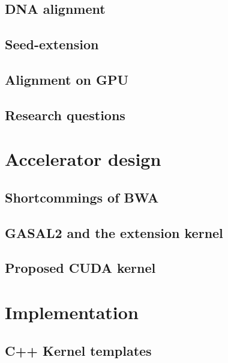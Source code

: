\documentclass[11pt,twoside]{ce}
\begin{document}
		\section{DNA alignment}
		
		
		\section{Seed-extension}
		
		
		\section{Alignment on GPU}
		
		
		\section{Research questions}
		
		
	\chapter{Accelerator design}
	\label{chap:accel}
		
		
		\section{Shortcommings of BWA}
		
		\section{GASAL2 and the extension kernel}
			
		
		\section{Proposed CUDA kernel}
		
	
	\chapter{Implementation}
	\label{chap:implementation}
	
		
		\section{C++ Kernel templates}
		
	
\end{document}
